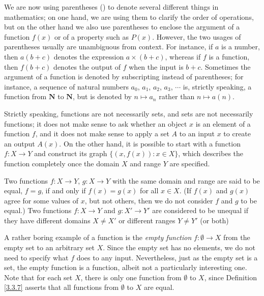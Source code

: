 \setcounter{theorem}{4}
\begin{remark}\label{3.3.5}
We are now using parentheses () to denote several different things in mathematics;
on one hand, we are using them to clarify the order of operations, but on the other hand we also use parentheses to enclose the argument of a function \(f(x)\) or of a property such as \(P(x)\).
However, the two usages of parentheses usually are unambiguous from context.
For instance, if \(a\) is a number, then \(a(b + c)\) denotes the expression \(a \times (b + c)\), whereas if \(f\) is a function, then \(f(b + c)\) denotes the output of \(f\) when the input is \(b + c\).
Sometimes the argument of a function is denoted by subscripting instead of parentheses;
for instance, a sequence of natural numbers \(a_0\), \(a_1\), \(a_2\), \(a_3\), \(\cdots\) is, strictly speaking, a function from \(\mathbf{N}\) to \(\mathbf{N}\), but is denoted by \(n \mapsto a_n\) rather than \(n \mapsto a(n)\).
\end{remark}

\begin{remark}\label{3.3.6}
Strictly speaking, functions are not necessarily sets, and sets are not necessarily functions;
it does not make sense to ask whether an object \(x\) is an element of a function \(f\), and it does not make sense to apply a set \(A\) to an input \(x\) to create an output \(A(x)\).
On the other hand, it is possible to start with a function \(f : X \to Y\) and construct its graph \(\{(x, f(x)) : x \in X\}\), which describes the function completely once the domain \(X\) and range \(Y\) are specified.
\end{remark}

\begin{definition}\label{3.3.7}
Two functions \(f : X \to Y\), \(g : X \to Y\) with the same domain and range are said to be equal, \(f = g\), if and only if \(f(x) = g(x)\) for all \(x \in X\).
(If \(f(x)\) and \(g(x)\) agree for some values of \(x\), but not others, then we do not consider \(f\) and \(g\) to be equal.)
Two functions \(f: X \to Y\) and \(g: X' \to Y'\) are considered to be unequal if they have different domains \(X \neq X'\) or different ranges \(Y \neq Y'\) (or both)
\end{definition}

\begin{note}
A rather boring example of a function is the \emph{empty function} \(f : \emptyset \to X\) from the empty set to an arbitrary set \(X\).
Since the empty set has no elements, we do not need to specify what \(f\) does to any input.
Nevertheless, just as the empty set is a set, the empty function is a function, albeit not a particularly interesting one.
Note that for each set \(X\), there is only one function from \(\emptyset\) to \(X\), since Definition \ref{3.3.7} asserts that all functions from \(\emptyset\) to \(X\) are equal.
\end{note}

